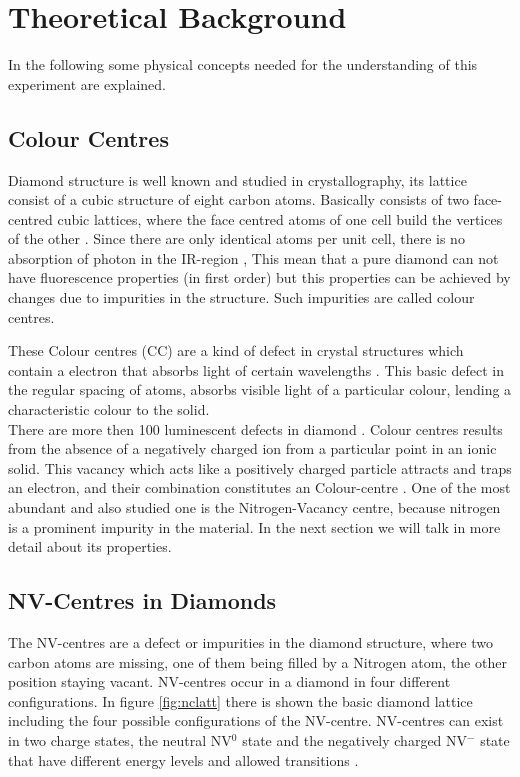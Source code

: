 \section{Theoretical Background}
In the following some physical concepts needed for the understanding of this experiment are explained.
\subsection{Colour Centres}

Diamond structure is well known and studied in crystallography, its lattice consist of a cubic structure of eight carbon atoms. Basically consists of two face-centred cubic lattices, where the face centred atoms of one cell build the vertices of the other \cite{sir_c_v_raman_crystal_1944}. Since there are only  identical atoms per unit cell, there is no absorption of photon in the IR-region \cite{mildren_1_nodate}, This mean that a pure diamond can not have fluorescence properties (in first order) but this properties can be achieved by changes due to impurities in the structure. Such impurities are called colour centres.

These Colour centres (CC) are a kind of defect in crystal structures which contain a electron that absorbs light of certain wavelengths \cite{lesik_engineering_2015}. This basic defect in the regular spacing of atoms, absorbs visible light of a particular colour, lending a characteristic colour to the solid. \\

There are more then 100 luminescent defects in diamond \cite{jelezko_single_2006}. Colour centres results from the absence of a negatively charged ion from a particular point in an ionic solid. This vacancy which acts like a positively charged particle attracts and traps an electron, and their combination constitutes an Colour-centre \cite{choudhury_principles_2014}. One of the most abundant and also studied one is the Nitrogen-Vacancy centre, because  nitrogen is a prominent impurity in the material. In the next section we will talk in more detail about its properties.


\subsection{NV-Centres in Diamonds}
\label{sec:nvcentres}
 The NV-centres are a defect or impurities in the diamond structure, where two carbon atoms are missing, one of them being filled by a Nitrogen atom, the other position staying vacant. NV-centres occur in a diamond in four different configurations. In figure \ref{fig:nclatt} there is shown the basic diamond lattice including the four possible configurations of the NV-centre. NV-centres can exist in two charge states, the neutral NV$^{0}$ state and the negatively charged NV$^{-}$ state that have different energy levels and allowed transitions \cite{pham_magnetic_nodate}.\\
 
